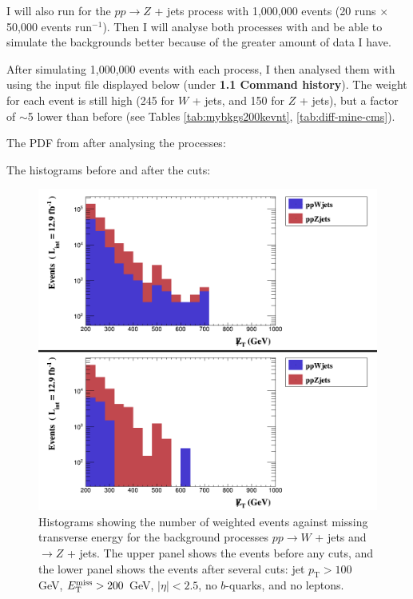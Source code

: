 I will also run \madgraph for the $pp \rightarrow Z$ + jets process with 1,000,000 events (20 runs $\times$ 50,000 events run$^{-1}$). Then I will analyse both processes with \madanalysis and be able to simulate the backgrounds better because of the greater amount of data I have.

After simulating 1,000,000 \madgraph events with each process, I then analysed them with \madanalysis using the input file displayed below (under \textbf{1.1 Command history}). The weight for each event is still high (245 for $W$ + jets, and 150 for $Z$ + jets), but a factor of $\sim$5 lower than before (see Tables \ref{tab:mybkgs200kevnt}, \ref{tab:diff-mine-cms}).

The PDF from \madanalysis after analysing the processes: %

The histograms before and after the cuts:

\begin{figure}[H]
\centering
\includegraphics[width=\textwidth]{./sec15/combined_selection.png}
\caption{Histograms showing the number of weighted events against missing transverse energy for the background processes $pp \rightarrow W$ + jets and $\rightarrow Z$ + jets. The upper panel shows the events before any cuts, and the lower panel shows the events after several cuts: jet $p_{\mathrm{T}} > 100$ GeV, $E_{\mathrm{T}}^{\text{miss}} > 200$ GeV, $|\eta| < 2.5$, no $b$-quarks, and no leptons.}
\end{figure}

